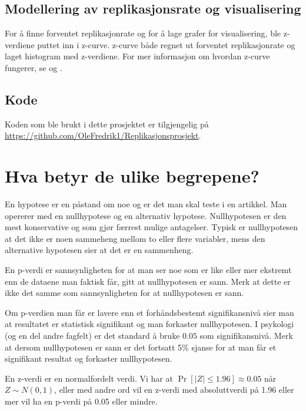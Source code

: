 \documentclass[doc,norsk]{apa7}
\begin{document}
\subsection{Modellering av replikasjonsrate og visualisering}
For å finne forventet replikasjonrate og for å lage grafer for visualisering, ble z-verdiene puttet inn i z-curve. z-curve både regnet ut forventet replikasjonrate og laget histogram med z-verdiene. For mer informasjon om hvordan z-curve fungerer, se \textcite{z-curve-modell} og \textcite{z-curve-implementasjon}. 

\subsection{Kode}
Koden som ble brukt i dette prosjektet er tilgjengelig på \url{https://github.com/OleFredrik1/Replikasjonsprosjekt}.

\section{Hva betyr de ulike begrepene?}
En hypotese er en påstand om noe og er det man skal teste i en artikkel. Man opererer med en nullhypotese og en alternativ hypotese. Nullhypotesen er den mest konservative og som gjør færrest mulige antagelser. Typisk er nullhypotesen at det ikke er noen sammeheng mellom to eller flere variabler, mens den alternative hypotesen sier at det er en sammenheng.

En p-verdi er sannsynligheten for at man ser noe som er like eller mer ekstremt enn de dataene man faktisk får, gitt at nullhypotesen er sann. Merk at dette er ikke det samme som sannsynligheten for at nullhypotesen er sann.

Om p-verdien man får er lavere enn et forhåndsbestemt signifikansnivå sier man at resultatet er statistisk signifikant og man forkaster nullhypotesen. I psykologi (og en del andre fagfelt) er det standard å bruke $0.05$ som signifikansnivå. Merk at dersom nullhypotesen er sann er det fortsatt 5\% sjanse for at man får et signifikant resultat og forkaster nullhypotesen.

En z-verdi er en normalfordelt verdi. Vi har at $\Pr[|Z| \leq 1.96] \approx 0.05$ når $Z \sim N(0, 1)$, eller med andre ord vil en z-verdi med absoluttverdi på 1.96 eller mer vil ha en p-verdi på 0.05 eller mindre.
\end{document}
